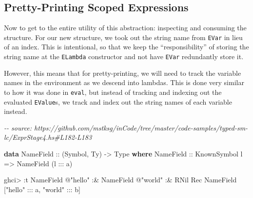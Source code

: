 \documentclass[]{article}
\newenvironment{Shaded}{}{}
\newcommand{\CommentTok}[1]{\textcolor[rgb]{0.38,0.63,0.69}{\textit{#1}}}
\newcommand{\DataTypeTok}[1]{\textcolor[rgb]{0.56,0.13,0.00}{#1}}
\newcommand{\KeywordTok}[1]{\textcolor[rgb]{0.00,0.44,0.13}{\textbf{#1}}}
\newcommand{\NormalTok}[1]{#1}
\newcommand{\OperatorTok}[1]{\textcolor[rgb]{0.40,0.40,0.40}{#1}}
\newcommand{\OtherTok}[1]{\textcolor[rgb]{0.00,0.44,0.13}{#1}}
\newcommand{\StringTok}[1]{\textcolor[rgb]{0.25,0.44,0.63}{#1}}
\begin{document}
\subsection{Pretty-Printing Scoped
Expressions}\label{pretty-printing-scoped-expressions}

Now to get to the entire utility of this abstraction: inspecting and consuming
the structure. For our new structure, we took out the string name from
\texttt{EVar} in lieu of an index. This is intentional, so that we keep the
``responsibility'' of storing the string name at the \texttt{ELambda}
constructor and not have \texttt{EVar} redundantly store it.

However, this means that for pretty-printing, we will need to track the variable
names in the environment as we descend into lambdas. This is done very similar
to how it was done in \texttt{eval}, but instead of tracking and indexing out
the evaluated \texttt{EValue}s, we track and index out the string names of each
variable instead.

\begin{Shaded}
\begin{Highlighting}[]
\CommentTok{{-}{-} source: https://github.com/mstksg/inCode/tree/master/code{-}samples/typed{-}sm{-}lc/ExprStage4.hs\#L182{-}L183}

\KeywordTok{data} \DataTypeTok{NameField}\OtherTok{ ::}\NormalTok{ (}\DataTypeTok{Symbol}\NormalTok{, }\DataTypeTok{Ty}\NormalTok{) }\OtherTok{{-}\textgreater{}} \DataTypeTok{Type} \KeywordTok{where}
  \DataTypeTok{NameField}\OtherTok{ ::} \DataTypeTok{KnownSymbol}\NormalTok{ l }\OtherTok{=\textgreater{}} \DataTypeTok{NameField}\NormalTok{ (l }\OperatorTok{:::}\NormalTok{ a)}
\end{Highlighting}
\end{Shaded}

\begin{Shaded}
\begin{Highlighting}[]
\NormalTok{ghci}\OperatorTok{\textgreater{}} \OperatorTok{:}\NormalTok{t }\DataTypeTok{NameField} \OperatorTok{@}\StringTok{"hello"} \OperatorTok{:\&} \DataTypeTok{NameField} \OperatorTok{@}\StringTok{"world"} \OperatorTok{:\&} \DataTypeTok{RNil}
\DataTypeTok{Rec} \DataTypeTok{NameField}\NormalTok{ [}\StringTok{"hello"} \OperatorTok{:::}\NormalTok{ a, }\StringTok{"world"} \OperatorTok{:::}\NormalTok{ b]}
\end{Highlighting}
\end{Shaded}
\end{document}
